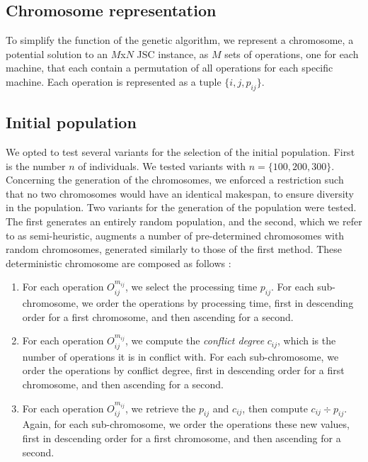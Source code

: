 \documentclass{mimosis}
\begin{document}
\subsection{Chromosome representation}

To simplify the function of the genetic algorithm, we represent a chromosome, a potential solution to an \(M\)x\(N\) JSC instance, as \(M\) sets of operations, one for each machine, that each contain a permutation of all operations for each specific machine. Each operation is represented as a tuple \(\{i, j, p_{ij}\}\).

\subsection{Initial population} \label{Initial population}
We opted to test several variants for the selection of the initial population. First is the number \(n\) of individuals. We tested variants with \(n = \{100, 200, 300\}\). Concerning the generation of the chromosomes, we enforced a restriction such that no two chromosomes would have an identical makespan, to ensure diversity in the population. Two variants for the generation of the population were tested. The first generates an entirely random population, and the second, which we refer to as semi-heuristic, augments a number of pre-determined chromosomes with random chromosomes, generated similarly to those of the first method. These deterministic chromosome are composed as follows :
\begin{enumerate}
\item For each operation \(O_{ij}^{m_{ij}}\), we select the processing time \(p_{ij}\). For each sub-chromosome, we order the operations by processing time, first in descending order for a first chromosome, and then ascending for a second.
\item For each operation \(O_{ij}^{m_{ij}}\), we compute the \emph{conflict degree} \(c_{ij}\), which is the number of operations it is in conflict with. For each sub-chromosome, we order the operations by conflict degree, first in descending order for a first chromosome, and then ascending for a second.
\item For each operation \(O_{ij}^{m_{ij}}\), we retrieve the \(p_{ij}\) and \(c_{ij}\), then compute \(c_{ij} \div p_{ij}\). Again, for each sub-chromosome, we order the operations these new values, first in descending order for a first chromosome, and then ascending for a second.
\end{enumerate}
\end{document}
